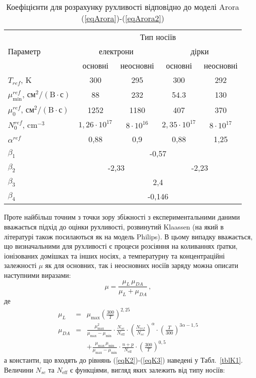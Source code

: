 \documentclass[10pt,a5paper,titlepage,oneside]{book}
\numberwithin{equation}{part}
\begin{document}
\begin{table}
\caption{Коефіцієнти для розрахунку рухливості відповідно до моделі Arora (\ref{eqArora})-(\ref{eqArora2})}
\label{tblArora}
\centering
\begin{tabular}{|l|c|c|c|c|}
\hline
\multirow{3}{*}{Параметр} & \multicolumn{4}{c|}{Тип носіїв}\\
\cline{2-5}
&\multicolumn{2}{c|}{електрони}&\multicolumn{2}{c|}{дірки}\\
\cline{2-5}
& основні \cite{Arora1982}& неосновні \cite{Swirhun1986}& основні \cite{Arora1982}& неосновні \cite{Alamo1985}\\
\hline
$T_{ref}$, K&300&295&300&292\\
\hline
$\mu_\mathrm{min}^{ref}$, $\text{см}^2/(\text{B}\cdot\text{с})$&88&232&54.3&130\\
\hline
$\mu_0^{ref}$, $\text{см}^2/(\text{B}\cdot\text{с})$&1252&1180&407&370\\
\hline
$N_0^{ref}$, cm$^{-3}$&$1,26\cdot10^{17}$&$8\cdot10^{16}$&$2,35\cdot10^{17}$&$8\cdot10^{17}$\\
\hline
$\alpha^{ref}$&0,88&0,9&0,88&1,25\\
\hline
$\beta_1$&\multicolumn{4}{c|}{-0,57}\\
\hline
$\beta_2$&\multicolumn{2}{c|}{-2,33}&\multicolumn{2}{c|}{-2,23}\\
\hline
$\beta_3$&\multicolumn{4}{c|}{2,4}\\
\hline
$\beta_4$&\multicolumn{4}{c|}{-0,146}\\
\hline
\end{tabular}
\end{table}

Проте найбільш точним з точки зору збіжності з експериментальними даними вважається підхід до оцінки рухливості, розвинутий   Klaassen \cite{KLAASSEN953}
(на який в  літературі також посилаються як на модель Philips).
В цьому випадку вважається, що визначальними для рухливості є процеси розсіяння на коливаннях ґратки, іонізованих домішках та інших носіях, а температурну та
концентраційні залежності $\mu$ як для основних, так і неосновних носіїв заряду можна описати наступними виразами:
\begin{equation}\label{eqK1}
  \mu=\frac{\mu_L\,\mu_{DA}}{\mu_L+\mu_{DA}}\,,
\end{equation}
де
\begin{eqnarray}
  \label{eqK2}
  \mu_L &=&  \mu_\mathrm{max} \left(\frac{300}{T}\right)^{2,25}\, \\ \label{eqK3}
 \nonumber  \mu_{DA}  &=& \frac{\mu_\mathrm{max}^2}{\mu_\mathrm{max} - \mu_\mathrm{min}} \cdot 
    \frac{N_{sc}}{N_\mathrm{eff}} \cdot \left(\frac{N_{ref}}{N_{sc}}\right)^{\alpha} \cdot \left(\frac{T}{300}\right)^{3\alpha - 1,5}\\
    &&+ \frac{\mu_\mathrm{max} \, \mu_\mathrm{min}}{\mu_\mathrm{max} - \mu_\mathrm{min}} \cdot \frac{n + p}{N_\mathrm{eff}} \cdot \left(\frac{300}{T}\right)^{0,5}\,
\end{eqnarray}
а константи, що входять до рівнянь (\ref{eqK2})-(\ref{eqK3}) наведені у Табл.~\ref{tblK1}.
Величини $N_{sc}$ та $N_\mathrm{eff}$ є функціями, вигляд яких залежить від типу носіїв:
\end{document}
